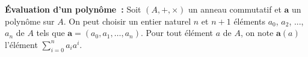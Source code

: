 
\medskip

\noindent\textbf{Évaluation d'un polynôme :} Soit $(A, +, \times)$ un anneau commutatif et $\mathbf{a}$ un polynôme sur $A$.
    On peut choisir un entier naturel $n$ et $n+1$ éléments $a_0$, $a_2$, ..., $a_n$ de $A$ tels que $\mathbf{a} = (a_0, a_1, \dots, a_n)$.
    Pour tout élément $a$ de $A$, on note $\mathbf{a}(a)$ l'élément $\sum_{i=0}^n a_i a^i$. 

